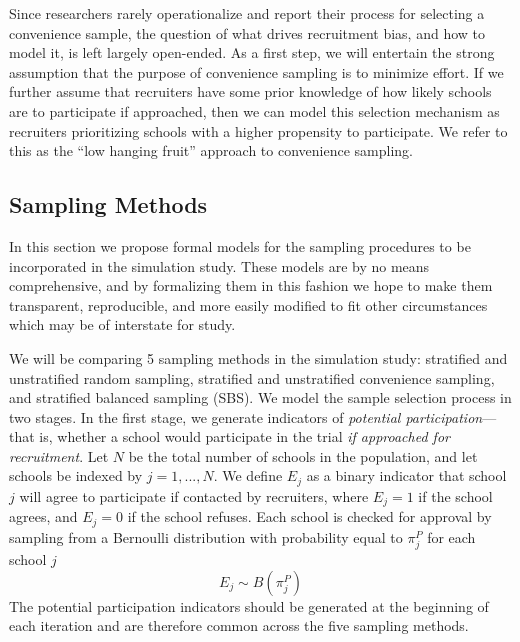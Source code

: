 \documentclass[man,floatsintext]{apa6}
\begin{document}
Since researchers rarely operationalize and report their process for selecting a convenience sample, the question of what drives recruitment bias, and how to model it, is left largely open-ended. As a first step, we will entertain the strong assumption that the purpose of convenience sampling is to minimize effort. If we further assume that recruiters have some prior knowledge of how likely schools are to participate if approached, then we can model this selection mechanism as recruiters prioritizing schools with a higher propensity to participate. We refer to this as the \enquote{low hanging fruit} approach to convenience sampling.

\hypertarget{sampling-methods}{%
\subsection{Sampling Methods}\label{sampling-methods}}


In this section we propose formal models for the sampling procedures to be incorporated in the simulation study. These models are by no means comprehensive, and by formalizing them in this fashion we hope to make them transparent, reproducible, and more easily modified to fit other circumstances which may be of interstate for study.

We will be comparing 5 sampling methods in the simulation study: stratified and unstratified random sampling, stratified and unstratified convenience sampling, and stratified balanced sampling (SBS). We model the sample selection process in two stages. In the first stage, we generate indicators of \emph{potential participation}---that is, whether a school would participate in the trial \emph{if approached for recruitment}. Let \(N\) be the total number of schools in the population, and let schools be indexed by \(j = 1, ..., N\). We define \(E_j\) as a binary indicator that school \(j\) will agree to participate if contacted by recruiters, where \(E_j = 1\) if the school agrees, and \(E_j = 0\) if the school refuses. Each school is checked for approval by sampling from a Bernoulli distribution with probability equal to \(\pi^P_j\) for each school \(j\)
\begin{equation}
\label{eq:Ej}
E_j \sim B(\pi^P_j)
\end{equation}
The potential participation indicators should be generated at the beginning of each iteration and are therefore common across the five sampling methods.
\end{document}
